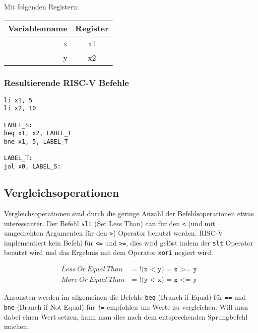 Mit folgenden Registern:

\begin{table}[H]
  \begin{center}
    \begin{tabular}{| r | c |}
      \hline
      Variablenname & Register \\
      \hline
      x & x1 \\
      y & x2 \\
      \hline
    \end{tabular}
  \end{center}
\end{table}

\subsubsection{Resultierende RISC-V Befehle}

\begin{lstlisting}
li x1, 5
li x2, 10

LABEL_S:
beq x1, x2, LABEL_T
bne x1, 5, LABEL_T

LABEL_T:
jal x0, LABEL_S:
\end{lstlisting}

\subsection{Vergleichsoperationen}

Vergleichsoperationen sind durch die geringe Anzahl der Befehlsoperationen etwas interessanter.
Der Befehl \texttt{slt} (Set Less Than) can für den \texttt{<} (und mit umgedrehten Argumenten für den \texttt{>}) Operator benutzt werden.
RISC-V implementiert kein Befehl für \texttt{<=} und \texttt{>=}, dies wird gelöst indem der \texttt{slt} Operator benutzt wird und das Ergebnis mit dem Operator \texttt{xori} negiert wird.

\begin{figure}[H]
  \begin{align*}
    Less\ Or\ Equal\ Than\ &\texttt{=\ !(x < y) = x >= y}\\
    More\ Or\ Equal\ Than\ &\texttt{=\ !(y < x) = x <= y}
  \end{align*}
\end{figure}
Ansonsten werden im allgemeinen die Befehle \texttt{beq} (Branch if Equal) für \texttt{==} und \texttt{bne} (Branch if Not Equal) für \texttt{!=} empfohlen um Werte zu vergleichen.
Will man dabei einen Wert setzen, kann man dies nach dem entsprechenden Sprungbefehl machen.\\


